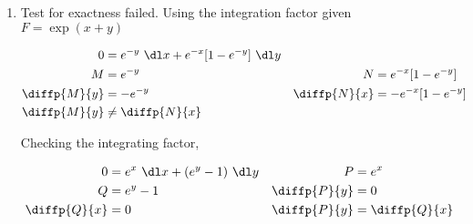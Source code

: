 \begin{enumerate}
          \begin{figure}[H]
              \centering
          \end{figure}

    \item Test for exactness failed. Using the integration factor given $ F = \exp(x+y) $

          \begin{align}
              0            & = e^{-y}\ \dl x + e^{-x}[1 - e^{-y}]\ \dl y   \\
              M            & = e^{-y}                                    &
              N            & = e^{-x}[1 - e^{-y}]                          \\
              \diffp{M}{y} & = -e^{-y}                                   &
              \diffp{N}{x} & = -e^{-x}[1 - e^{-y}]                         \\
              \diffp{M}{y} & \neq \diffp{N}{x}
          \end{align}

          Checking the integrating factor,

          \begin{align}
              0            & = e^{x}\ \dl x + (e^{y} - 1)\ \dl y &
              P            & = e^{x}                               \\
              Q            & = e^{y} - 1                         &
              \diffp{P}{y} & = 0                                   \\
              \diffp{Q}{x} & = 0                                 &
              \diffp{P}{y} & = \diffp{Q}{x}
          \end{align}


\end{enumerate}
